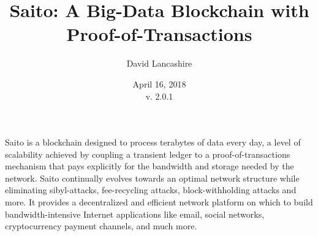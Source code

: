 \documentclass[11.5pt, oneside]{article}   	%
\title{Saito: A Big-Data Blockchain with Proof-of-Transactions}
\author{David Lancashire}
\date{April 16, 2018\\v. 2.0.1}
\begin{document}
\maketitle



\begin{onecolabstract}
Saito is a blockchain designed to process terabytes of data every day, a level of scalability achieved by coupling a transient ledger to a proof-of-transactions mechanism that pays explicitly for the bandwidth and storage needed by the network. Saito continually evolves towards an optimal network structure while eliminating sibyl-attacks, fee-recycling attacks, block-withholding attacks and more. It provides a decentralized and efficient network platform on which to build bandwidth-intensive Internet applications like email, social networks, cryptocurrency payment channels, and much more.
\end{onecolabstract}
\end{document}
